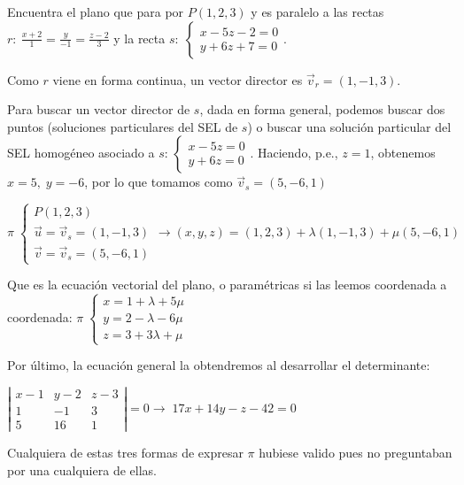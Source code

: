 \begin{ejre}
Encuentra el plano que para por $P(1,2,3)$ y es paralelo a las rectas $r:\: \frac{x+2}{1}=	\frac{y}{-1}=\frac{z-2}{3}$ y la recta \small{$s:\; \begin{cases} x-5z-2=0\\y+6z+7=0 \end{cases}$}\normalsize{.}
\end{ejre}

\begin{proofw}\renewcommand{\qedsymbol}{$\diamond$}
Como $r$ viene en forma continua, un vector director es $\vec v_r=(1,-1,3)$.

 \noindent Para buscar un vector director de $s$, dada en forma general, podemos buscar dos puntos (soluciones particulares del SEL de $s$)	o buscar una solución particular del SEL homogéneo asociado a $s$: $\begin{cases} x-5z=0\\y+6z=0 \end{cases}$. Haciendo, p.e., $z=1$, obtenemos $x=5,\; y=-6$, por lo que tomamos como $\vec v_s=(5,-6,1)$

 \noindent $\pi\; \begin{cases} P(1,2,3)\\ \vec u=\vec v_s=(1,-1,3) \\ \vec v=\vec v_s=(5,-6,1) \end{cases} \to (x,y,z)=(1,2,3)+\lambda(1,-1,3)+\mu(5,-6,1)$
 
  \noindent Que es la ecuación vectorial del plano, o paramétricas si las leemos coordenada a coordenada: $\pi\; \begin{cases} x=1+\lambda+5\mu \\y=2-\lambda -6\mu \\ z=3+3\lambda +\mu \end{cases}$
  
  \noindent Por último, la ecuación general la obtendremos al desarrollar el determinante:
  
   \noindent $\left| \begin{matrix} x-1&y-2&z-3 \\ 1&-1&3 \\ 5&16&1 \end{matrix} \right|=0 \to \; 17x+14y-z-42=0$
   
   \noindent Cualquiera de estas tres formas de expresar $\pi$ hubiese valido pues no preguntaban por una cualquiera de ellas.
  
 \end{proofw}
 
